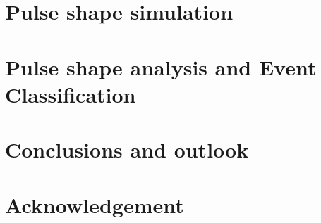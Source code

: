 \documentclass[11pt,a4paper]{book}
\begin{document}
\chapter{Pulse shape simulation}
\label{cha:pss}

\clearpage{\pagestyle{empty}\cleardoublepage}

\chapter{Pulse shape analysis and Event Classification}
\label{cha:psa}


\chapter{Conclusions and outlook}
\label{cha:con}

\clearpage{\pagestyle{empty}\cleardoublepage}

\chapter*{Acknowledgement}
\label{cha:ack}
 
\clearpage{\pagestyle{empty}\cleardoublepage}


\end{document}
